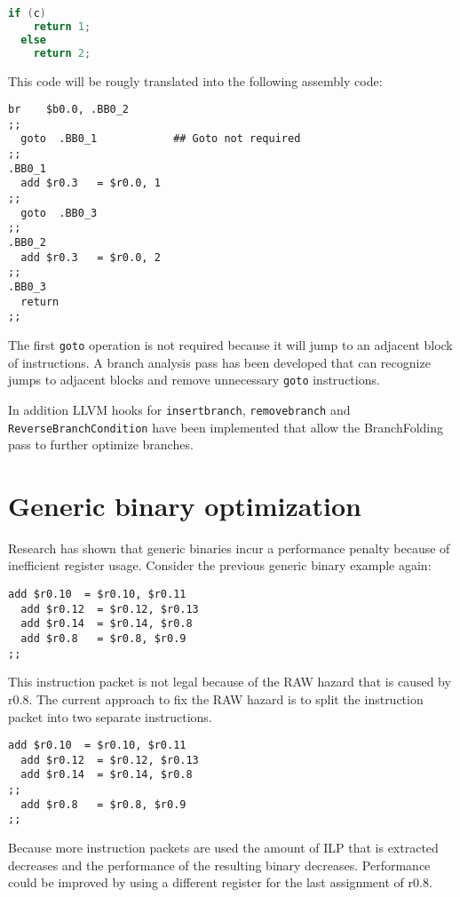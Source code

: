 \begin{lstlisting}[language=c]
  if (c)
    return 1;
  else
    return 2;
\end{lstlisting}

This code will be rougly translated into the following assembly code:

\begin{lstlisting}[language=rvex]
  br    $b0.0, .BB0_2
;;
  goto  .BB0_1            ## Goto not required
;;
.BB0_1
  add $r0.3   = $r0.0, 1
;;
  goto  .BB0_3
;;
.BB0_2
  add $r0.3   = $r0.0, 2
;;
.BB0_3
  return
;;
\end{lstlisting}

The first \texttt{goto} operation is not required because it will jump to an adjacent block of instructions. A branch analysis pass has been developed that can recognize jumps to adjacent blocks and remove unnecessary \texttt{goto} instructions.

In addition LLVM hooks for \texttt{insertbranch}, \texttt{removebranch} and \texttt{ ReverseBranchCondition} have been implemented that allow the BranchFolding pass to further optimize branches.


\section{Generic binary optimization}
Research has shown \cite{Anthony-Brandon:2013jk} that generic binaries incur a performance penalty because of inefficient register usage. Consider the previous generic binary example again:

\begin{lstlisting}[language=rvex]
  add $r0.10  = $r0.10, $r0.11
  add $r0.12  = $r0.12, $r0.13
  add $r0.14  = $r0.14, $r0.8
  add $r0.8   = $r0.8, $r0.9
;;
\end{lstlisting}

This instruction packet is not legal because of the RAW hazard that is caused by r0.8. The current approach to fix the RAW hazard is to split the instruction packet into two separate instructions. 

\begin{lstlisting}[language=rvex]
  add $r0.10  = $r0.10, $r0.11
  add $r0.12  = $r0.12, $r0.13
  add $r0.14  = $r0.14, $r0.8
;;
  add $r0.8   = $r0.8, $r0.9
;;
\end{lstlisting}

Because more instruction packets are used the amount of ILP that is extracted decreases and the performance of the resulting binary decreases. Performance could be improved by using a different register for the last assignment of r0.8. 

